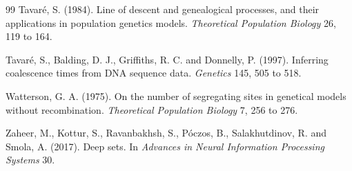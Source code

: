 \begin{thebibliography}{99}
Tavar\'e, S. (1984). Line of descent and genealogical processes, and their applications in population genetics models. \emph{Theoretical Population Biology} 26, 119 to 164.

Tavar\'e, S., Balding, D. J., Griffiths, R. C. and Donnelly, P. (1997). Inferring coalescence times from DNA sequence data. \emph{Genetics} 145, 505 to 518.

Watterson, G. A. (1975). On the number of segregating sites in genetical models without recombination. \emph{Theoretical Population Biology} 7, 256 to 276.

Zaheer, M., Kottur, S., Ravanbakhsh, S., P\'oczos, B., Salakhutdinov, R. and Smola, A. (2017). Deep sets. In \emph{Advances in Neural Information Processing Systems} 30.

\end{thebibliography}
